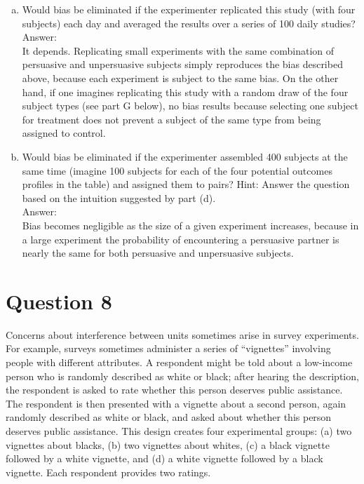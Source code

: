 \documentclass[11pt,notitlepage]{article}\usepackage[]{graphicx}\usepackage[]{color}
\begin{document}
\begin{enumerate}[a)]
\item Would bias be eliminated if the experimenter replicated this study (with four subjects) each day and averaged the results over a series of 100 daily studies? \\
Answer:\\
It depends. Replicating small experiments with the same combination of persuasive and unpersuasive subjects simply reproduces the bias described above, because each experiment is subject to the same bias.  On the other hand, if one imagines replicating this study with a random draw of the four subject types (see part G below), no bias results because selecting one subject for treatment does not prevent a subject of the same type from being assigned to control.
\item Would bias be eliminated if the experimenter assembled 400 subjects at the same time (imagine 100 subjects for each of the four potential outcomes profiles in the table) and assigned them to pairs? Hint: Answer the question based on the intuition suggested by part (d). \\
Answer:\\
Bias becomes negligible as the size of a given experiment increases, because in a large experiment the probability of encountering a persuasive partner is nearly the same for both persuasive and unpersuasive subjects.
\end{enumerate}

\section*{Question 8}
Concerns about interference between units sometimes arise in survey experiments. For example, surveys sometimes administer a series of ``vignettes'' involving people with different attributes. A respondent might be told about a low-income person who is randomly described as white or black; after hearing the description, the respondent is asked to rate whether this person deserves public assistance. The respondent is then presented with a vignette about a second person, again randomly described as white or black, and asked about whether this person deserves public assistance. This design creates four experimental groups: (a) two vignettes about blacks, (b) two vignettes about whites, (c) a black vignette followed by a white vignette, and (d) a white vignette followed by a black vignette. Each respondent provides two ratings.
\end{document}
